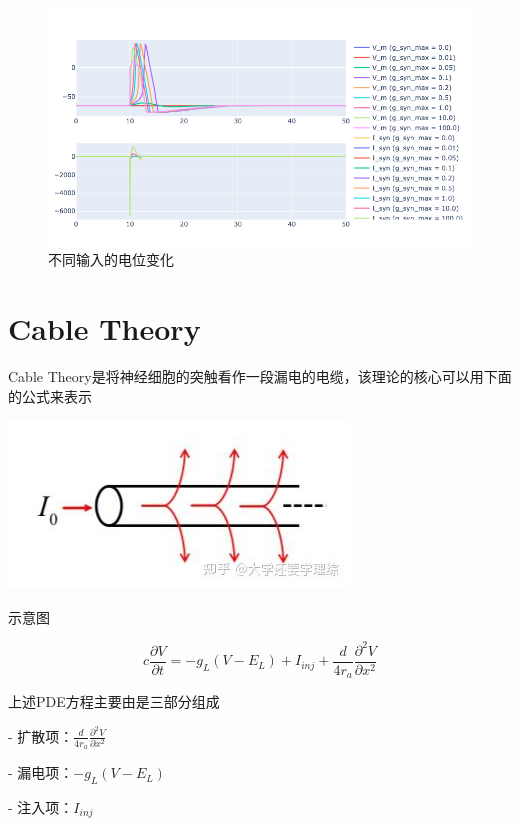 \documentclass[nols, a4paper]{tufte-handout}
\begin{document}
\begin{figure}
  \includegraphics[width = 0.95\linewidth]{image/multople_input.png} 
  \caption{不同输入的电位变化}
  \label{mutilple}
\end{figure}

\section{Cable Theory}
Cable Theory是将神经细胞的突触看作一段漏电的电缆，该理论的核心可以用下面的公式来表示

\begin{marginfigure}
  \includegraphics[width=\linewidth]{image/Cabel Theory.jpg} 
  \caption{示意图}
  \label{Cable Theory}
\end{marginfigure}
\[
c\frac{\partial V}{\partial t} = -g_L(V - E_L) + I_{inj} + \frac{d}{4r_a}\frac{\partial^2 V}{\partial x^2}
\]

上述PDE方程主要由是三部分组成

- 扩散项：$\frac{d}{4r_a}\frac{\partial^2 V}{\partial x^2}$

- 漏电项：$-g_L(V - E_L)$

- 注入项：$I_{inj}$
\end{document}
